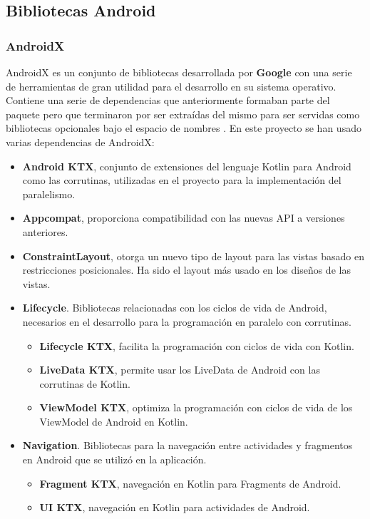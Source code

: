 \subsection{Bibliotecas Android}

\subsubsection{AndroidX}

AndroidX es un conjunto de bibliotecas desarrollada por \textbf{Google} con una serie de herramientas de gran utilidad para el desarrollo en su sistema operativo. Contiene una serie de dependencias que anteriormente formaban parte del paquete  pero que terminaron por ser extraídas del mismo para ser servidas como bibliotecas opcionales bajo el espacio de nombres . En este proyecto se han usado varias dependencias de AndroidX:

\begin{itemize}
    \item \textbf{Android KTX}, conjunto de extensiones del lenguaje Kotlin para Android como las corrutinas, utilizadas en el proyecto para la implementación del paralelismo.
    \item \textbf{Appcompat}, proporciona compatibilidad con las nuevas API a versiones anteriores.
    \item \textbf{ConstraintLayout}, otorga un nuevo tipo de layout para las vistas basado en restricciones posicionales. Ha sido el layout más usado en los diseños de las vistas.
    \item \textbf{Lifecycle}. Bibliotecas relacionadas con los ciclos de vida de Android, necesarios en el desarrollo para la programación en paralelo con corrutinas.
    \begin{itemize}
        \item \textbf{Lifecycle KTX}, facilita la programación con ciclos de vida con Kotlin.
        \item \textbf{LiveData KTX}, permite usar los LiveData de Android con las corrutinas de Kotlin.
        \item \textbf{ViewModel KTX}, optimiza la programación con ciclos de vida de los ViewModel de Android en Kotlin. 
    \end{itemize}
    \item \textbf{Navigation}. Bibliotecas para la navegación entre actividades y fragmentos en Android que se utilizó en la aplicación.
    \begin{itemize}
        \item \textbf{Fragment KTX}, navegación en Kotlin para Fragments de Android.
        \item \textbf{UI KTX}, navegación en Kotlin para actividades de Android.
    \end{itemize}
\end{itemize}

